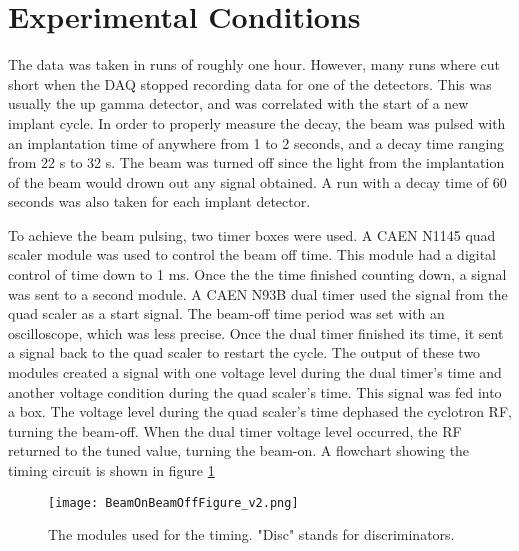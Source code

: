 \documentclass[../MaxHughesThesis.tex]{subfiles}
\begin{document}
\section{Experimental Conditions}
The data was taken in runs of roughly one hour. 
However, many runs where cut short when the DAQ stopped recording data for one of the detectors.
This was usually the up gamma detector, and was correlated with the start of a new implant cycle.
In order to properly measure the decay, the beam was pulsed with an implantation time of anywhere from 1 to 2 seconds, and a decay time ranging from 22 s to 32 s. 
The beam was turned off since the light from the implantation of the beam would drown out any signal obtained. 
A run with a decay time of 60 seconds was also taken for each implant detector. 

To achieve the beam pulsing, two timer boxes were used.
A CAEN N1145 quad scaler module was used to control the beam off time.
This module had a digital control of time down to 1 ms.
Once the the time finished counting down, a signal was sent to a second module. 
A CAEN N93B dual timer used the signal from the quad scaler as a start signal.
The beam-off time period was set with an oscilloscope, which was less precise. 
Once the dual timer finished its time, it sent a signal back to the quad scaler to restart the cycle.
The output of these two modules created a signal with one voltage level during the dual timer's time and another voltage condition during the quad scaler's time.
This signal was fed into a box.
The voltage level during the quad scaler's time dephased the cyclotron RF, turning the beam-off.
When the dual timer voltage level occurred, the RF returned to the tuned value, turning the beam-on.  
A flowchart showing the timing circuit is shown in figure \ref{fig:TimingFig} 
\begin{figure}
	\centerline{\texttt{[image: BeamOnBeamOffFigure\_v2.png]}}
	\caption{The modules used for the timing.
		 "Disc" stands for discriminators.
		 }
	\label{fig:TimingFig}
\end{figure}
\end{document}
